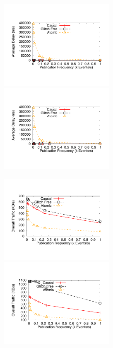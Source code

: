 \documentclass[11pt]{article}
\begin{document}
\begin{figure}
	\includegraphics[width=0.5\textwidth]{graphs/pubFrequencyDelay}
	\includegraphics[width=0.5\textwidth]{referencegraphs/pubFrequencyDelay}
\end{figure}
\begin{figure}
	\includegraphics[width=0.5\textwidth]{graphs/pubFrequencyTraffic}
	\includegraphics[width=0.5\textwidth]{referencegraphs/pubFrequencyTraffic}
\end{figure}
\end{document}
